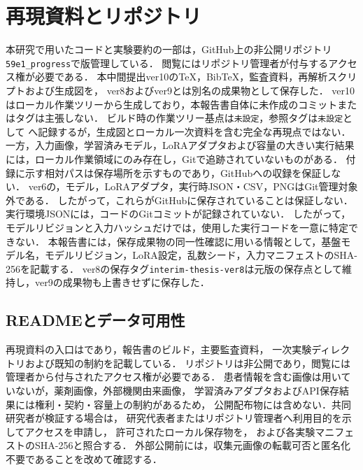 \documentclass[uplatex,dvipdfmx]{jsarticle}
\newcommand{\ReportGitCommit}{未設定}%
\newcommand{\ReportGitTag}{未設定}%
\begin{document}
\clearpage

\appendix
\section{再現資料とリポジトリ}

本研究で用いたコードと実験要約の一部は，GitHub上の非公開リポジトリ\texttt{59e1\_progress}で版管理している\cite{repo_59e1progress}．
閲覧にはリポジトリ管理者が付与するアクセス権が必要である．
本中間提出ver10のTeX，BibTeX，監査資料，再解析スクリプトおよび生成図を，
ver8およびver9とは別名の成果物として保存した．
ver10はローカル作業ツリーから生成しており，本報告書自体に未作成のコミットまたはタグは主張しない．
ビルド時の作業ツリー基点は\texttt{\ReportGitCommit}，参照タグは\texttt{\ReportGitTag}として
へ記録するが，生成図とローカル一次資料を含む完全な再現点ではない．
一方，入力画像，学習済みモデル，LoRAアダプタおよび容量の大きい実行結果には，ローカル作業領域にのみ存在し，Gitで追跡されていないものがある．
付録に示す相対パスは保存場所を示すものであり，GitHubへの収録を保証しない．
ver6の，モデル，LoRAアダプタ，実行時JSON・CSV，PNGはGit管理対象外である．
したがって，これらがGitHubに保存されていることは保証しない．
実行環境JSONには，コードのGitコミットが記録されていない．
したがって，モデルリビジョンと入力ハッシュだけでは，使用した実行コードを一意に特定できない．
本報告書には，保存成果物の同一性確認に用いる情報として，基盤モデル名，モデルリビジョン，LoRA設定，乱数シード，入力マニフェストのSHA-256を記載する．
ver8の保存タグ\texttt{interim-thesis-ver8}は元版の保存点として維持し，ver9の成果物も上書きせずに保存した．

\subsection{READMEとデータ可用性}

再現資料の入口はであり，報告書のビルド，主要監査資料，
一次実験ディレクトリおよび既知の制約を記載している．
リポジトリは非公開であり，閲覧には管理者から付与されたアクセス権が必要である．
患者情報を含む画像は用いていないが，薬剤画像，外部機関由来画像，
学習済みアダプタおよびAPI保存結果には権利・契約・容量上の制約があるため，
公開配布物には含めない．共同研究者が検証する場合は，
研究代表者またはリポジトリ管理者へ利用目的を示してアクセスを申請し，
許可されたローカル保存物を，
および各実験マニフェストのSHA-256と照合する．
外部公開前には，収集元画像の転載可否と匿名化不要であることを改めて確認する．
\end{document}
